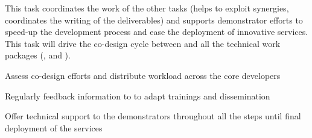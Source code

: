 \begin{task}[
  title=Co-design and technical support,
  id=codesign-support,
  lead=SRL,
  PM=15,
  wphases={0-48},
  partners={XFEL,EGI,CDS,INSERM,QS,SIL,UIO,UPSUD,WTT,EP}
]


This task coordinates the work of the other  tasks (helps to exploit synergies, coordinates the writing of the deliverables) and supports demonstrator efforts to speed-up the development process and ease the deployment of innovative services. This task will drive the co-design cycle between  and all the technical work packages (,  and ).

\begin{compactitem}
\item Assess co-design efforts and distribute workload across the core developers
\item Regularly feedback information to  to adapt trainings and dissemination 
\item Offer technical support to the demonstrators throughout all the steps until final deployment of the services
\end{compactitem}

\end{task}
